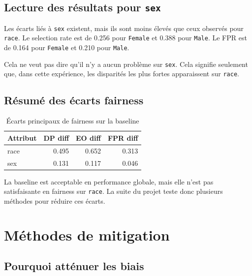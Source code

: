 \documentclass[12pt,a4paper]{report}
\begin{document}
\section{Lecture des résultats pour \texttt{sex}}

Les écarts liés à \texttt{sex} existent, mais ils sont moins élevés que ceux observés pour \texttt{race}. Le selection rate est de 0.256 pour \texttt{Female} et 0.388 pour \texttt{Male}. Le FPR est de 0.164 pour \texttt{Female} et 0.210 pour \texttt{Male}.

\begin{tcolorbox}[infobox]
Cela ne veut pas dire qu'il n'y a aucun problème sur \texttt{sex}. Cela signifie seulement que, dans cette expérience, les disparités les plus fortes apparaissent sur \texttt{race}.
\end{tcolorbox}

\section{Résumé des écarts fairness}

\begin{table}[H]
\centering
\caption{Écarts principaux de fairness sur la baseline}
\begin{tabular}{lrrr}
\toprule
Attribut & DP diff & EO diff & FPR diff \\
\midrule
race & 0.495 & 0.652 & 0.313 \\
sex & 0.131 & 0.117 & 0.046 \\
\bottomrule
\end{tabular}
\end{table}

\begin{tcolorbox}[warningbox, title={Conclusion de l'audit baseline}]
La baseline est acceptable en performance globale, mais elle n'est pas satisfaisante en fairness sur \texttt{race}. La suite du projet teste donc plusieurs méthodes pour réduire ces écarts.
\end{tcolorbox}

\chapter{Méthodes de mitigation}

\section{Pourquoi atténuer les biais}
\end{document}
